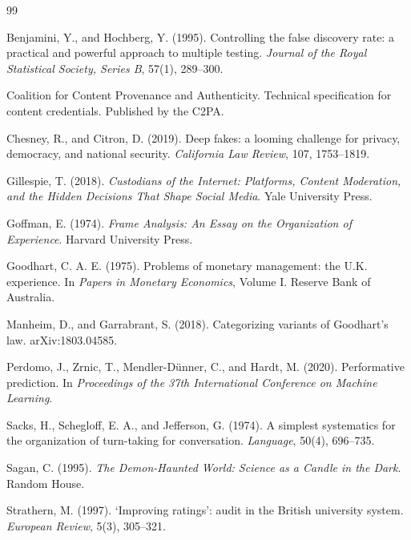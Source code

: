\documentclass[12pt]{article}
\theoremstyle{plain}
\theoremstyle{definition}
\theoremstyle{remark}
\begin{document}
\begin{thebibliography}{99}

Benjamini, Y., and Hochberg, Y. (1995). Controlling the false discovery rate: a practical and powerful approach to multiple testing. \emph{Journal of the Royal Statistical Society, Series B}, 57(1), 289--300.

Coalition for Content Provenance and Authenticity. Technical specification for content credentials. Published by the C2PA.

Chesney, R., and Citron, D. (2019). Deep fakes: a looming challenge for privacy, democracy, and national security. \emph{California Law Review}, 107, 1753--1819.

Gillespie, T. (2018). \emph{Custodians of the Internet: Platforms, Content Moderation, and the Hidden Decisions That Shape Social Media}. Yale University Press.

Goffman, E. (1974). \emph{Frame Analysis: An Essay on the Organization of Experience}. Harvard University Press.

Goodhart, C. A. E. (1975). Problems of monetary management: the U.K. experience. In \emph{Papers in Monetary Economics}, Volume I. Reserve Bank of Australia.

Manheim, D., and Garrabrant, S. (2018). Categorizing variants of Goodhart's law. arXiv:1803.04585.

Perdomo, J., Zrnic, T., Mendler-D\"unner, C., and Hardt, M. (2020). Performative prediction. In \emph{Proceedings of the 37th International Conference on Machine Learning}.

Sacks, H., Schegloff, E. A., and Jefferson, G. (1974). A simplest systematics for the organization of turn-taking for conversation. \emph{Language}, 50(4), 696--735.

Sagan, C. (1995). \emph{The Demon-Haunted World: Science as a Candle in the Dark}. Random House.

Strathern, M. (1997). `Improving ratings': audit in the British university system. \emph{European Review}, 5(3), 305--321.

\end{thebibliography}
\end{document}
